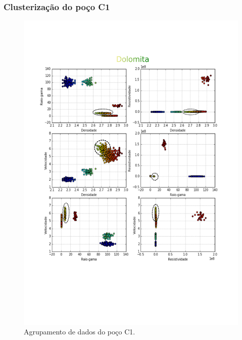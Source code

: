\documentclass[10pt]{beamer} %
\begin{document}
\begin{frame}
	\frametitle{Clusterização do poço C1}
	\begin{figure}[H]
		\centering
		\includegraphics[scale=0.3]{Imagens/dolomitaC1.png}
		\caption{Agrupamento de dados do poço C1.}
	\end{figure} 
\end{frame}
\end{document}

